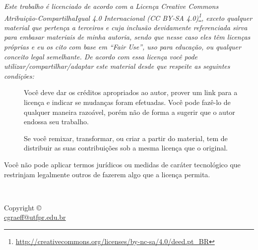 \begin{center}
\Huge\ccbysa
\end{center}
{\it
Este trabalho é licenciado de acordo com a Licença Creative Commons  Atribuição-CompartilhaIgual 4.0 Internacional  (CC BY-SA 4.0)\footnote{\url{http://creativecommons.org/licenses/by-nc-sa/4.0/deed.pt_BR}}, exceto qualquer material que pertença a terceiros e cuja inclusão devidamente referenciada sirva para embasar materiais de minha autoria, sendo que nesse caso eles têm licenças próprias e eu os cito com base em \emph{``Fair Use''}, uso para educação, ou qualquer conceito legal semelhante. De acordo com essa licença você pode utilizar/compartilhar/adaptar este material desde que respeite as seguintes condições:
\begin{description}
	\item[\ccAttribution]Você deve dar os créditos apropriados ao autor, prover um link para a licença e indicar se mudanças foram efetuadas. Você pode fazê-lo de qualquer maneira razoável, porém não de forma a sugerir que o autor endossa seu trabalho.
    \item[\ccShareAlike]Se você remixar, transformar, ou criar a partir do material, tem de distribuir as suas contribuições sob a mesma licença que o original.
\end{description}
Você não pode aplicar termos jurídicos ou medidas de caráter tecnológico que restrinjam legalmente outros de fazerem algo que a licença permita.
}
%
~\vfill
\begin{fullwidth}
\thispagestyle{empty}
\setlength{\parindent}{0pt}
\setlength{\parskip}{\baselineskip}
Copyright \copyright\ \the\year\ \thanklessauthor\\
\url{cgraeff@utfpr.edu.br}

\par\textit{\monthyear}
\end{fullwidth}
